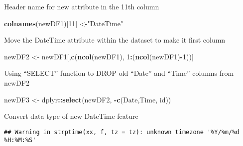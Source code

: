\documentclass[]{article}
\newenvironment{Shaded}{\begin{snugshade}}{\end{snugshade}}
\newcommand{\CommentTok}[1]{\textcolor[rgb]{0.56,0.35,0.01}{\textit{#1}}}
\newcommand{\DecValTok}[1]{\textcolor[rgb]{0.00,0.00,0.81}{#1}}
\newcommand{\KeywordTok}[1]{\textcolor[rgb]{0.13,0.29,0.53}{\textbf{#1}}}
\newcommand{\NormalTok}[1]{#1}
\newcommand{\OperatorTok}[1]{\textcolor[rgb]{0.81,0.36,0.00}{\textbf{#1}}}
\newcommand{\StringTok}[1]{\textcolor[rgb]{0.31,0.60,0.02}{#1}}
\begin{document}
Header name for new attribute in the 11th column

\begin{Shaded}
\begin{Highlighting}[]
\KeywordTok{colnames}\NormalTok{(newDF1)[}\DecValTok{11}\NormalTok{] <-}\StringTok{"DateTime"}
\end{Highlighting}
\end{Shaded}

Move the DateTime attribute within the dataset to make it first column

\begin{Shaded}
\begin{Highlighting}[]
\NormalTok{newDF2 <-}\StringTok{ }\NormalTok{newDF1[,}\KeywordTok{c}\NormalTok{(}\KeywordTok{ncol}\NormalTok{(newDF1), }\DecValTok{1}\OperatorTok{:}\NormalTok{(}\KeywordTok{ncol}\NormalTok{(newDF1)}\OperatorTok{-}\DecValTok{1}\NormalTok{))]}
\end{Highlighting}
\end{Shaded}

Using ``SELECT'' function to DROP old ``Date'' and ``Time'' columns from
newDF2

\begin{Shaded}
\begin{Highlighting}[]
\NormalTok{newDF3 <-}\StringTok{ }\NormalTok{dplyr}\OperatorTok{::}\KeywordTok{select}\NormalTok{(newDF2, }\OperatorTok{-}\KeywordTok{c}\NormalTok{(Date,Time, id))}
\end{Highlighting}
\end{Shaded}

\begin{Shaded}
\end{Shaded}

Convert data type of new DateTime feature

\begin{Shaded}
\end{Shaded}

\begin{verbatim}
## Warning in strptime(xx, f, tz = tz): unknown timezone '%Y/%m/%d %H:%M:%S'
\end{verbatim}
\end{document}
